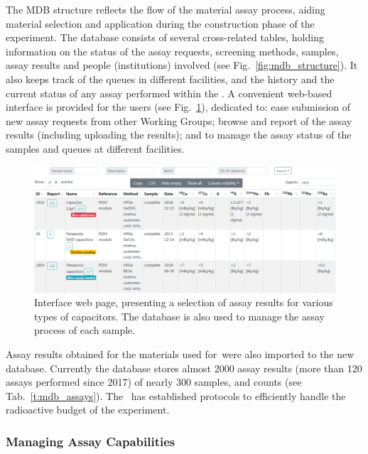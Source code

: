 The MDB structure reflects the flow of the material assay process, aiding material selection and application during the construction phase of the experiment. The database consists of several cross-related tables, holding information on the status of the assay requests, screening methods, samples, assay results and people (institutions) involved (see Fig.~\ref{fig:mdb_structure}). It also keeps track of the queues in different facilities, and the history and the current status of any assay performed within the \MAWG. A convenient web-based interface is provided for the users (see Fig.~\ref{fig:mdb_results}), dedicated to: ease submission of new assay requests from other Working Groups; browse and report of the assay results (including uploading the results); and to manage the assay status of the samples and queues at different facilities.

\begin{figure}[!t]
\center\includegraphics[width=\textwidth]{./Figures/mdb_results.png}
\caption[Web interface of \DSks\ materials database]{Interface web page, presenting a selection of assay results for various types of capacitors. The database is also used to manage the assay process of each sample.}
\label{fig:mdb_results}
\end{figure} 

Assay results obtained for the materials used for \DSfs\,were also imported to the new database. Currently the database stores almost 2000 assay results (more than 120 assays performed since 2017) of nearly 300 samples, and counts (see Tab.~\ref{t:mdb_assays}). The \MAWG\ has established protocols to efficiently handle the radioactive budget of the experiment.


\subsubsection{Managing Assay Capabilities}
\label{sec:MatAssay-RadiopurityManagement}

